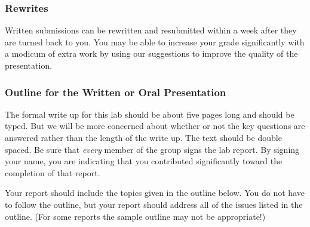 \subsubsection {Rewrites}
Written submissions can be rewritten and resubmitted within a week
after they are turned back to you.   You may be
able to increase your grade significantly with a modicum of extra work
by using our suggestions to improve the quality of the presentation.


\subsubsection{Outline for the Written  or Oral Presentation}

The formal write up for this lab should be about five pages long and
should be typed.  But we will be more
concerned about whether or not the key questions are answered rather
than the length of the write up.  The text should be double spaced. Be
sure that {\it every} member of the group signs the lab report.  By
signing your name, you are indicating that you contributed
significantly toward the completion of that report.


Your report should include the topics given in the outline below.  You
do not have to follow the outline, but your report should address all
of the issues listed in the outline.  (For some reports the sample
outline may not be appropriate!)

